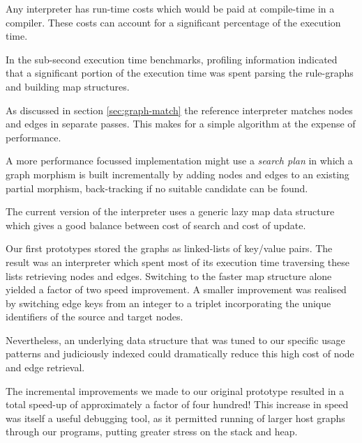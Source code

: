 Any interpreter has run-time costs which would be paid at compile-time in a compiler. These costs can account for a significant percentage of the execution time.

In the sub-second execution time benchmarks, profiling information indicated that a significant portion of the execution time was spent parsing the rule-graphs and building map structures.



As discussed in section \ref{sec:graph-match} the reference interpreter matches nodes and edges in separate passes. This makes for a simple algorithm at the expense of performance.

A more performance focussed implementation might use a \textit{search plan}\cite{Horvath-Varro07} in which a graph morphism is built incrementally by adding nodes and edges to an existing partial morphism, back-tracking if no suitable candidate can be found.



The current version of the interpreter uses a generic lazy map data structure which gives a good balance between cost of search and cost of update. 

Our first prototypes stored the graphs as linked-lists of key/value pairs. The result was an interpreter which spent most of its execution time traversing these lists retrieving nodes and edges. Switching to the faster map structure alone yielded a factor of two speed improvement. A smaller improvement was realised by switching edge keys from an integer to a triplet incorporating the unique identifiers of the source and target nodes.

Nevertheless, an underlying data structure that was tuned to our specific usage patterns and judiciously indexed could dramatically reduce this high cost of node and edge retrieval.

The incremental improvements we made to our original prototype resulted in a total speed-up of approximately a factor of four hundred! This increase in speed was itself a useful debugging tool, as it permitted running of larger host graphs through our programs, putting greater stress on the stack and heap.

